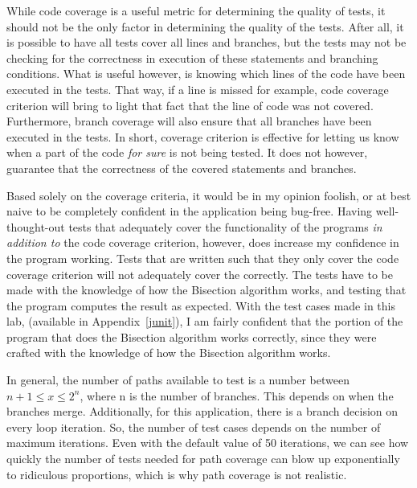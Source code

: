 While code coverage is a useful metric for determining the quality of tests, it
should not be the only factor in determining the quality of the tests. After
all, it is possible to have all tests cover all lines and branches, but the
tests may not be checking for the correctness in execution of these statements
and branching conditions.  What is useful however, is knowing which lines of
the code have been executed in the tests. That way, if a line is missed for
example, code coverage criterion will bring to light that fact that the line of
code was not covered. Furthermore, branch coverage will also ensure that all
branches have been executed in the tests. In short, coverage criterion is
effective for letting us know when a part of the code \textit{for sure} is not
being tested. It does not however, guarantee that the correctness of the
covered statements and branches.

Based solely on the coverage criteria, it would be in my opinion foolish,
or at best naive to be completely confident in the application being bug-free.
Having well-thought-out tests that adequately cover the functionality of the
programs \textit{in addition to} the code coverage criterion, however, does
increase my confidence in the program working. Tests that are written such that 
they only cover the code coverage criterion will not adequately cover the 
correctly. The tests have to be made with the knowledge of how the Bisection
algorithm works, and testing that the program computes the result as expected.
With the test cases made in this lab, (available in Appendix~\ref{junit}),
I am fairly confident that the portion of the program that does the Bisection
algorithm works correctly, since they were crafted with the knowledge
of how the Bisection algorithm works. 

In general, the number of paths available to test is a number between
$n+1 \leq x \leq 2^n$, where n is the number of branches. This depends
on when the branches merge. Additionally, for this application,
there is a branch decision on every loop iteration. So, the number of test
cases depends on the number of maximum iterations. Even with the default value
of 50 iterations, we can see how quickly the number of tests needed for path
coverage can blow up exponentially to ridiculous proportions, which is why
path coverage is not realistic. 
